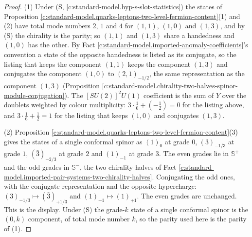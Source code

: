 \documentclass[11pt]{article}
\theoremstyle{definition}
\theoremstyle{plain}
\providecommand{\CS}{}\renewcommand{\CS}{{\mathbb{S}^{+}}}
\providecommand{\CSm}{}\renewcommand{\CSm}{{\mathbb{S}^{-}}}
\begin{document}
\begin{proof}
(1) Under (S, \ref{c:standard-model.hyp-s-slot-statistics}) the states of Proposition \ref{c:standard-model.quarks-leptons-two-level-fermion-content}(1) and (2) have total mode numbers $2$, $1$ and $4$ for $(1,1)$, $(1,0)$ and $(1,3)$, and by (S) the chirality is the parity; so $(1,1)$ and $(1,3)$ share a handedness and $(1,0)$ has the other. By Fact \ref{c:standard-model.imported-anomaly-coefficients}'s convention a state of the opposite handedness is listed as its conjugate, so the listing that keeps the component $(1,1)$ keeps the component $(1,3)$ and conjugates the component $(1,0)$ to $(2,1)_{-1/2}$, the same representation as the component $(1,3)$ (Proposition \ref{c:standard-model.chirality-two-halves-spinor-module-conjugation}). The $[SU(2)]^{2}U(1)$ coefficient is the sum of $Y$ over the doublets weighted by colour multiplicity: $3 \cdot \tfrac16 + (-\tfrac12) = 0$ for the listing above, and $3 \cdot \tfrac16 + \tfrac12 = 1$ for the listing that keeps $(1,0)$ and conjugates $(1,3)$.

(2) Proposition \ref{c:standard-model.quarks-leptons-two-level-fermion-content}(3) gives the states of a single conformal spinor as $(1)_{0}$ at grade $0$, $(3)_{-1/3}$ at grade $1$, $(\bar{3})_{-2/3}$ at grade $2$ and $(1)_{-1}$ at grade $3$. The even grades lie in $\CS$ and the odd grades in $\CSm{}$, the two chirality halves of Fact \ref{c:standard-model.imported-pair-systems-two-chirality-halves}. Conjugating the odd ones, with the conjugate representation and the opposite hypercharge: $(3)_{-1/3} \mapsto (\bar{3})_{+1/3}$ and $(1)_{-1} \mapsto (1)_{+1}$. The even grades are unchanged. This is the display. Under (S) the grade-$k$ state of a single conformal spinor is the $(0, k)$ component, of total mode number $k$, so the parity used here is the parity of (1).


\end{proof}
\end{document}
